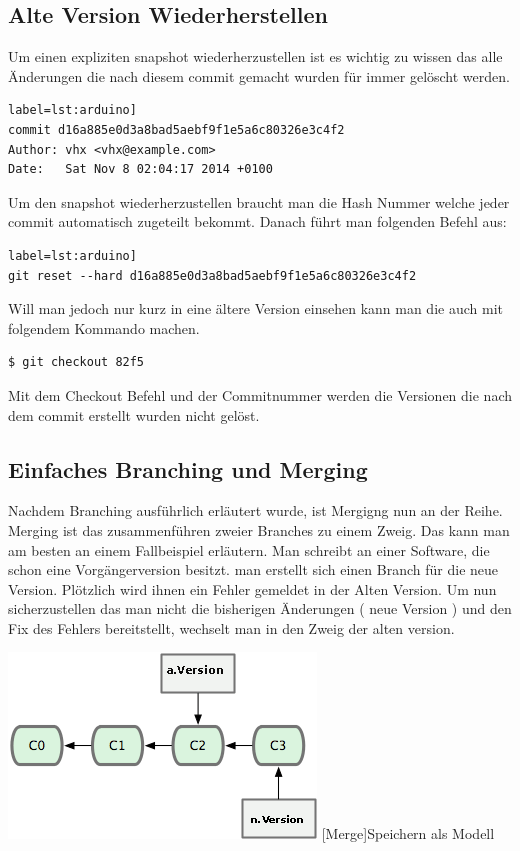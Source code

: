 \documentclass[12pt,a4paper,bibliography=totocnumbered,listof=totocnumbered]{scrartcl}
\begin{document}
\subsection{Alte Version Wiederherstellen}
Um einen expliziten snapshot wiederherzustellen ist es wichtig zu wissen das alle Änderungen die nach diesem commit gemacht wurden für immer gelöscht werden. 
\begin{lstlisting}[caption=git log Befehl] label=lst:arduino]
commit d16a885e0d3a8bad5aebf9f1e5a6c80326e3c4f2
Author: vhx <vhx@example.com>
Date:   Sat Nov 8 02:04:17 2014 +0100
\end{lstlisting}
Um den snapshot wiederherzustellen braucht man die Hash Nummer welche jeder commit automatisch zugeteilt bekommt.
Danach führt man  folgenden Befehl aus:
\begin{lstlisting}[caption=snapshot wiederherstellen (wird gelöst)] label=lst:arduino]
git reset --hard d16a885e0d3a8bad5aebf9f1e5a6c80326e3c4f2
\end{lstlisting}

Will man jedoch nur kurz in eine ältere Version einsehen kann man die auch mit folgendem Kommando machen.
\begin{lstlisting}[caption=snapshot wiederherstellen (wird nicht gelöscht)]
$ git checkout 82f5
\end{lstlisting}
Mit dem Checkout Befehl und der Commitnummer werden die Versionen die nach dem commit erstellt wurden nicht gelöst.  
	
\subsection{Einfaches Branching und Merging}
Nachdem Branching ausführlich erläutert wurde, ist Mergigng  nun an der Reihe. Merging ist das zusammenführen zweier Branches zu einem Zweig.
Das kann man am besten an einem Fallbeispiel erläutern. 
Man schreibt an einer Software, die schon eine Vorgängerversion besitzt. 
man erstellt sich einen Branch für die neue Version. 
Plötzlich wird ihnen ein Fehler gemeldet in der Alten Version. Um nun sicherzustellen das man nicht die bisherigen Änderungen ( neue Version ) und den Fix des Fehlers bereitstellt, wechselt man in den Zweig der alten version. 

\vspace{1em}
\begin{minipage}{\linewidth}
	\centering
	\includegraphics[width=0.5\linewidth]{Bilder/merge.png}
	[Merge]{Speichern als Modell\footnotemark }
	\label{fig:gitspeichern}
\end{minipage} 	
\end{document}
